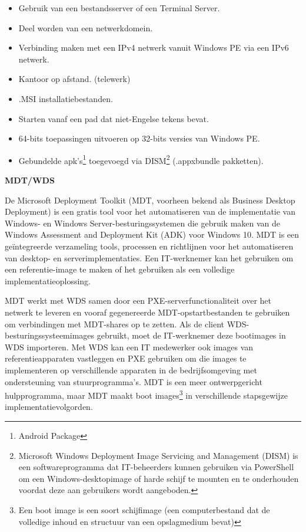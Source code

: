 \begin{itemize}

    \item Gebruik van een bestandsserver of een Terminal Server.

    \item Deel worden van een netwerkdomein.

    \item Verbinding maken met een IPv4 netwerk vanuit Windows PE via een IPv6 netwerk.

    \item Kantoor op afstand. (telewerk)

    \item .MSI installatiebestanden.

    \item Starten vanaf een pad dat niet-Engelse tekens bevat.

    \item 64-bits toepassingen uitvoeren op 32-bits versies van Windows PE.

    \item Gebundelde apk's\footnote{Android Package} toegevoegd via DISM\footnote{Microsoft Windows Deployment Image Servicing and Management (DISM) is een softwareprogramma dat IT-beheerders kunnen gebruiken via  PowerShell om een Windows-desktopimage of harde schijf te mounten en te onderhouden voordat deze aan gebruikers wordt aangeboden.} (.appxbundle pakketten).

\end{itemize}

\textbf{MDT/WDS}

De Microsoft Deployment Toolkit (MDT, voorheen bekend als Business Desktop Deployment) is een gratis tool voor het automatiseren van de implementatie van Windows- en Windows Server-besturingssystemen die gebruik maken van de Windows Assessment and Deployment Kit (ADK) voor Windows 10. MDT is een geïntegreerde verzameling tools, processen en richtlijnen voor het automatiseren van desktop- en serverimplementaties. Een IT-werknemer kan het gebruiken om een referentie-image te maken of het gebruiken als een volledige implementatieoplossing.\autocite{Christian2021}

MDT werkt met WDS samen door een PXE-serverfunctionaliteit over het netwerk te leveren en vooraf gegenereerde MDT-opstartbestanden te gebruiken om verbindingen met MDT-shares op te zetten. Als de client WDS-besturingssysteemimages gebruikt, moet de IT-werknemer deze bootimages in WDS importeren. Met WDS kan een IT medewerker ook images van referentieapparaten vastleggen en PXE gebruiken om die images te implementeren op verschillende apparaten in de bedrijfsomgeving met ondersteuning van stuurprogramma's. MDT is een meer ontwerpgericht hulpprogramma, maar MDT maakt boot images\footnote{Een boot image is een soort schijfimage (een computerbestand dat de volledige inhoud en structuur van een opslagmedium bevat)} in verschillende stapsgewijze implementatievolgorden.\autocite{Christian2021}

